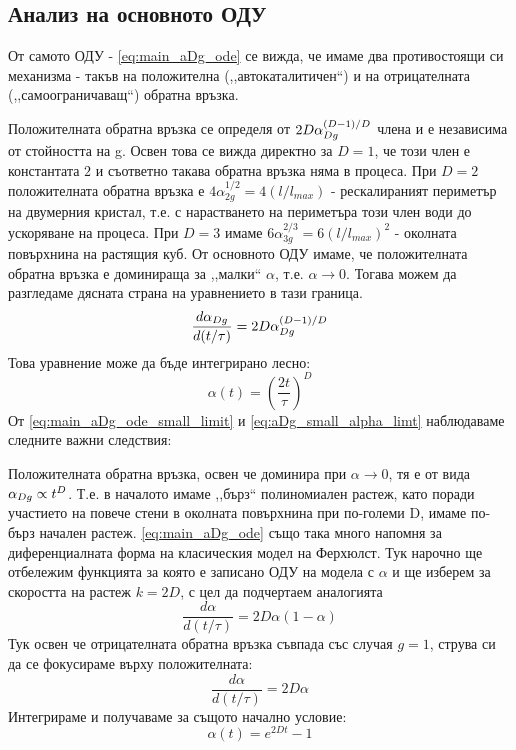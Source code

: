 \subsection{Анализ на основното ОДУ}
От самото ОДУ - \autoref{eq:main_aDg_ode} се вижда, че имаме два противостоящи си механизма - такъв на положителна (,,автокаталитичен``) и на отрицателната (,,самоограничаващ``) обратна връзка. 

Положителната обратна връзка се определя от $2D\alpha_{Dg}^{(D-1)/D}$ члена и е независима от стойността на g. Освен това се вижда директно за $D = 1$, че този член е константата $2$ и съответно такава обратна връзка няма в процеса. При $D = 2$ положителната обратна връзка е $4\alpha_{2g}^{1/2} = 4 (l/l_{max})$ - рескалираният периметър на двумерния кристал, т.е. с нарастването на периметъра този член води до ускоряване на процеса. При $D = 3$ имаме  $6\alpha_{3g}^{2/3} = 6 (l/l_{max})^2$ - околната повърхнина на растящия куб. От основното ОДУ имаме, че положителната обратна връзка е доминираща за ,,малки`` $\alpha$, т.е. $\alpha \rightarrow 0$. Тогава можем да разгледаме дясната страна на уравнението в тази граница. 
\begin{equation}
	\label{eq:main_aDg_ode_small_limit}
	\frac{d\alpha_{Dg}}{d(t/\tau)} = 2D\alpha_{Dg}^{(D-1)/D}
\end{equation}
Това уравнение може да бъде интегрирано лесно:
\begin{equation}
	\label{eq:aDg_small_alpha_limt}
	\alpha(t) = \left(\frac{2t}{\tau}\right)^D
\end{equation}
От \autoref{eq:main_aDg_ode_small_limit} и \autoref{eq:aDg_small_alpha_limt} наблюдаваме следните важни следствия:

Положителната обратна връзка, освен че доминира при $\alpha \rightarrow 0$, тя е от вида $\alpha_{Dg} \propto t^D$. Т.е. в началото имаме ,,бърз`` полиномиален растеж, като поради участието на повече стени в околната повърхнина при по-големи D, имаме по-бърз начален растеж.
\autoref{eq:main_aDg_ode} също така много напомня за диференциалната форма на класическия модел на Ферхюлст. Тук нарочно ще отбележим функцията за която е записано ОДУ на модела с $\alpha$ и ще изберем за скоростта на растеж $k = 2D$, с цел да подчертаем аналогията 
\begin{equation}
	\frac{d\alpha}{d(t/\tau)} = 2D\alpha (1-\alpha)
\end{equation}
Тук освен че отрицателната обратна връзка съвпада със случая $g = 1$, струва си да се фокусираме върху положителната:
\begin{equation*}
	\frac{d\alpha}{d(t/\tau)} = 2D \alpha
\end{equation*}
Интегрираме и получаваме за същото начално условие:
\begin{equation*}
	\alpha(t) = e^{2Dt} - 1
\end{equation*}


